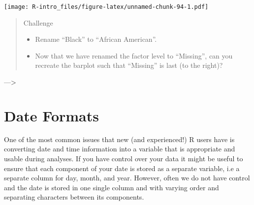 \documentclass[
]{book}
\newenvironment{Shaded}{\begin{snugshade}}{\end{snugshade}}
\newcommand{\DocumentationTok}[1]{\textcolor[rgb]{0.56,0.35,0.01}{\textbf{\textit{#1}}}}
\newcommand{\FunctionTok}[1]{\textcolor[rgb]{0.13,0.29,0.53}{\textbf{#1}}}
\newcommand{\NormalTok}[1]{#1}
\newcommand{\OtherTok}[1]{\textcolor[rgb]{0.56,0.35,0.01}{#1}}
\newcommand{\SpecialCharTok}[1]{\textcolor[rgb]{0.81,0.36,0.00}{\textbf{#1}}}
\newcommand{\StringTok}[1]{\textcolor[rgb]{0.31,0.60,0.02}{#1}}
\providecommand{\tightlist}{%
  \setlength{\itemsep}{0pt}\setlength{\parskip}{0pt}}
\begin{document}
\begin{Shaded}
\end{Shaded}

\texttt{[image: R-intro\_files/figure-latex/unnamed-chunk-94-1.pdf]}

\begin{quote}
Challenge

\begin{itemize}
\tightlist
\item
  Rename ``Black'' to ``African American''.
\item
  Now that we have renamed the factor level to ``Missing'', can you recreate the
  barplot such that ``Missing'' is last (to the right)?
\end{itemize}
\end{quote}

---\textgreater{}

\hypertarget{date-formats}{%
\section{Date Formats}\label{date-formats}}

One of the most common issues that new (and experienced!) R users have is converting
date and time information into a variable that is appropriate and usable during
analyses. If you have control over your data it might be useful to ensure that each component of your date is stored as a separate
variable, i.e a separate column for day, month, and year. However, often we do not have control and the date is stored in one single column and with varying order and separating characters between its components.
\end{document}

